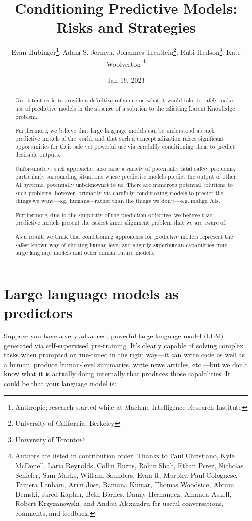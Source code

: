\documentclass[
  onecolumn,
  nonatbib,
]{miri-tech-article}
\title{Conditioning Predictive Models: Risks and Strategies}
\author{
Evan Hubinger\thanks{Anthropic; research started while at Machine Intelligence Research Institute},
Adam S. Jermyn,
Johannes Treutlein\thanks{University of California, Berkeley},
Rubi Hudson\thanks{University of Toronto},
Kate Woolverton
\thanks{Authors are listed in contribution order. Thanks to Paul Christiano, Kyle McDonell, Laria Reynolds, Collin Burns, Rohin Shah, Ethan Perez, Nicholas Schiefer, Sam Marks, William Saunders, Evan R. Murphy, Paul Colognese, Tamera Lanham, Arun Jose, Ramana Kumar, Thomas Woodside, Abram Demski, Jared Kaplan, Beth Barnes, Danny Hernandez, Amanda Askell, Robert Krzyzanowski, and Andrei Alexandru for useful conversations, comments, and feedback.}}
\date{Jan 19, 2023}
\begin{document}
\maketitle

\begin{abstract}
    Our intention is to provide a definitive reference on what it would take to safely make use of predictive models in the absence of a solution to the Eliciting Latent Knowledge\cite{elk} problem.

    Furthermore, we believe that large language models can be understood as such predictive models of the world, and that such a conceptualization raises significant opportunities for their safe yet powerful use via carefullly conditioning them to predict desirable outputs.

    Unfortunately, such approaches also raise a variety of potentially fatal safety problems, particularly surrounding situations where predictive models predict the output of other AI systems, potentially unbeknownst to us. There are numerous potential solutions to such problems, however, primarily via carefully conditioning models to predict the things we want---e.g. humans---rather than the things we don't---e.g. malign AIs.

    Furthermore, due to the simplicity of the prediction objective, we believe that predictive models present the easiest inner alignment\cite{risks} problem that we are aware of.

    As a result, we think that conditioning approaches for predictive models represent the safest known way of eliciting human-level and slightly superhuman capabilities from large language models and other similar future models.
\end{abstract}

\tableofcontents



\section{Large language models as predictors}
\label{sec:1}

Suppose you have a very advanced, powerful large language model (LLM) generated via self-supervised pre-training. It's clearly capable of solving complex tasks when prompted or fine-tuned in the right way---it can write code as well as a human, produce human-level summaries, write news articles, etc.---but we don't know what it is actually doing internally that produces those capabilities. It could be that your language model is:
\end{document}
